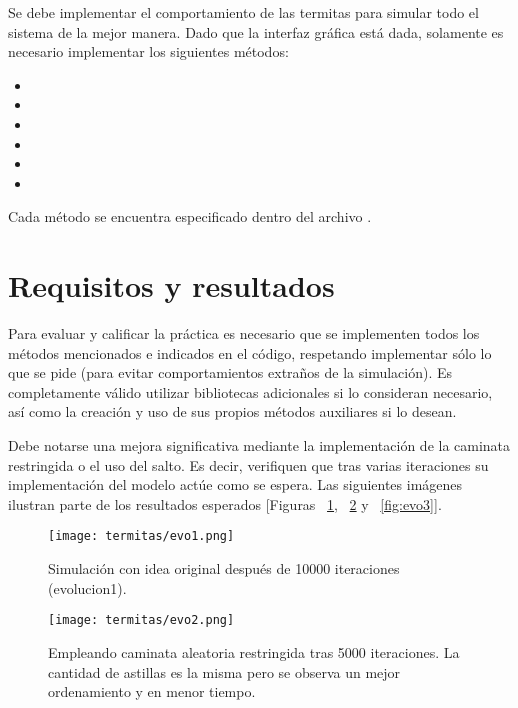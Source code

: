 Se debe implementar el comportamiento de las termitas para simular todo el sistema de la mejor manera. Dado que la interfaz gráfica está dada, solamente es necesario implementar los siguientes métodos:

\begin{itemize}
  \item {}
  \item {}
  \item {}
  \item {}
  \item {}
  \item {}
\end{itemize}

Cada método se encuentra especificado dentro del archivo .


\section{Requisitos y resultados}

Para evaluar y calificar la práctica es necesario que se implementen todos los métodos mencionados e indicados en el código, respetando implementar sólo lo que se pide (para evitar comportamientos extraños de la simulación).
Es completamente válido utilizar bibliotecas adicionales si lo consideran necesario, así como la creación y uso de sus propios métodos auxiliares si lo desean.

Debe notarse una mejora significativa mediante la implementación de la caminata restringida o el uso del salto. Es decir, verifiquen que tras varias iteraciones su implementación del modelo actúe como se espera. Las siguientes imágenes ilustran parte de los resultados esperados [Figuras ~\ref{fig:evo1}, ~\ref{fig:evo2} y ~\ref{fig:evo3}].

\begin{figure}
  \centering
  \texttt{[image: termitas/evo1.png]}
  \caption{Simulación con idea original después de 10000 iteraciones (evolucion1).}
  \label{fig:evo1}
\end{figure}

\begin{figure}
  \centering
  \texttt{[image: termitas/evo2.png]}
  \caption{Empleando caminata aleatoria restringida tras 5000 iteraciones. La cantidad de astillas es la misma pero se observa un mejor ordenamiento y en menor tiempo.}
  \label{fig:evo2}
\end{figure}

